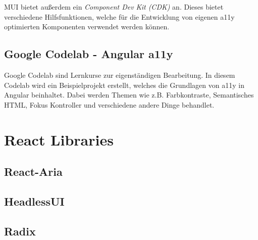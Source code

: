 MUI bietet außerdem ein \emph{Component Dev Kit (CDK)} an. Dieses bietet verschiedene Hilfsfunktionen, welche für die Entwicklung von eigenen a11y optimierten Komponenten verwendet werden können. \cite{angular_components_team_angular_nodate}

\subsection{Google Codelab - Angular a11y}

Google Codelab sind Lernkurse zur eigenständigen Bearbeitung. In diesem Codelab wird ein Beispielprojekt erstellt, welches die Grundlagen von a11y in Angular beinhaltet. Dabei werden Themen wie z.B. Farbkontraste, Semantisches HTML, Fokus Kontroller und verschiedene andere Dinge behandlet.

\section{React Libraries}

\subsection{React-Aria}

\subsection{HeadlessUI}

\subsection{Radix}
